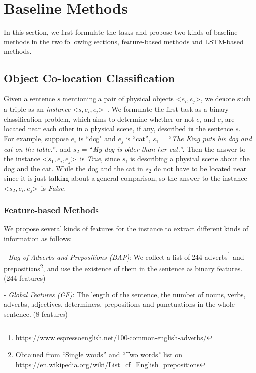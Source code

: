 \section{Baseline Methods}
\label{sec:method}
In this section, we first formulate the tasks and propose two kinds of baseline methods in the two following sections, feature-based methods and LSTM-based methods.

\subsection{Object Co-location Classification}
\label{sec:classify} 
Given a sentence $s$ mentioning a pair of physical objects 
\textless$e_i,e_j$\textgreater, 
we denote such a triple as an \textit{instance} \textless$s,e_i,e_j$\textgreater~. 
We formulate the first task as a binary classification problem, which aims to determine whether or not $e_i$ and $e_j$ are located near each other 
in a physical scene, if any, described in the sentence $s$.
For example, suppose $e_i$ is ``dog" and $e_j$ is ``cat'', $s_1$ = ``\textit{The King puts his dog and cat on the table.}'', 
and $s_2$ = ``\textit{My dog is older than her cat.}''.
Then the answer to the instance \textless$s_1,e_i,e_j$\textgreater ~is \textit{True}, 
since $s_1$ is describing a physical scene about the dog and the cat.
While the dog and the cat in $s_2$ do not have to be located near since it is just talking about a general comparison, so the answer to  the instance \textless$s_2,e_i,e_j$\textgreater ~is \textit{False}.

\subsubsection{Feature-based Methods}
We propose several kinds of features for the instance to extract different kinds of information as follows:

- \textit{Bag of Adverbs and Prepositions (BAP)}: We collect a list of 244 adverbs\footnote{\url{https://www.espressoenglish.net/100-common-english-adverbs/}} and prepositions\footnote{Obtained from ``Single words'' and ``Two words'' list on \url{https://en.wikipedia.org/wiki/List_of_English_prepositions}}, and use the existence of them in the sentence as binary features. (244 features)

- \textit{Global Features (GF)}: The length of the sentence, the number of nouns, verbs, adverbs, adjectives, determiners, prepositions and punctuations in the whole sentence. (8 features)

